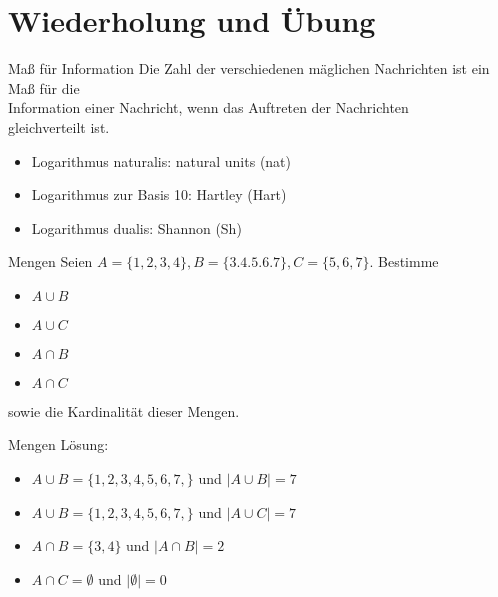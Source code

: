 \def\tutdate{2.11.2017}


\section{Wiederholung und Übung}
\begin{frame}{Maß für Information}
	Die Zahl der verschiedenen mäglichen Nachrichten ist ein Maß für die\\
	Information einer Nachricht, wenn das Auftreten der Nachrichten\\
	 gleichverteilt ist.
	 \begin{itemize}
		 \item Logarithmus naturalis: natural units (nat)
		 \item Logarithmus zur Basis 10: Hartley (Hart)
		 \item Logarithmus dualis: Shannon (Sh)
	 \end{itemize}
\end{frame}

\begin{frame}{Mengen}
	Seien $A=\{1,2,3,4\}, B=\{3.4.5.6.7\}, C=\{5,6,7\}$. Bestimme
	\begin{itemize}
		\item $A \cup B$
		\item $A \cup C$
		\item $A \cap B$
		\item $A \cap C$
	\end{itemize}
	sowie die Kardinalität dieser Mengen.
\end{frame}
\begin{frame}{Mengen}
	Lösung:
	\begin{itemize}
		\item $A \cup B = \{1,2,3,4,5,6,7,\}$ und $\mid A \cup B\mid = 7$
		\pause
		\item $A \cup B = \{1,2,3,4,5,6,7,\}$ und $\mid A \cup C\mid = 7$
		\pause
		\item $A \cap B = \{3,4\}$ und $\mid A \cap B \mid = 2$
		\pause
		\item $A \cap C = \emptyset$ und $\mid\emptyset\mid = 0$
	\end{itemize}
\end{frame}

